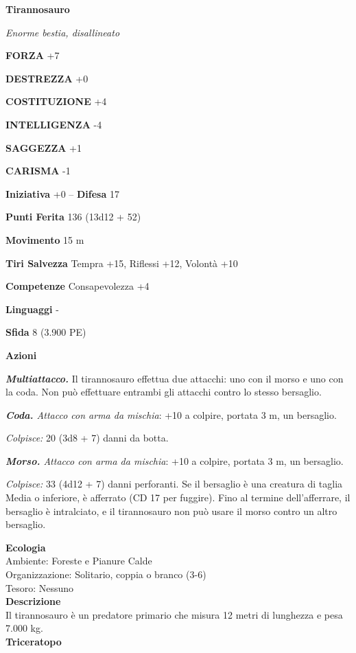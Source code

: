 \begin{multicols}{2}
\medskip{}\textbf{Tirannosauro}

\emph{Enorme bestia, disallineato}

\textbf{FORZA} +7

\textbf{DESTREZZA} +0

\textbf{COSTITUZIONE} +4

\textbf{INTELLIGENZA} -4

\textbf{SAGGEZZA} +1

\textbf{CARISMA} -1

\textbf{Iniziativa} +0 -- \textbf{Difesa} 17

\textbf{Punti Ferita} 136 (13d12 + 52)

\textbf{Movimento} 15 m

\textbf{Tiri Salvezza} Tempra +15, Riflessi +12, Volontà +10

\textbf{Competenze} Consapevolezza +4

\textbf{Linguaggi} -

\textbf{Sfida} 8 (3.900 PE)

\textbf{Azioni}

\emph{\textbf{Multiattacco.}} Il tirannosauro effettua due attacchi: uno con il morso e uno con la coda. Non può effettuare entrambi gli attacchi contro lo stesso bersaglio.

\emph{\textbf{Coda.} Attacco con arma da mischia}: +10 a colpire, portata 3 m, un bersaglio.

\emph{Colpisce:} 20 (3d8 + 7) danni da botta.

\emph{\textbf{Morso.} Attacco con arma da mischia}: +10 a colpire, portata 3 m, un bersaglio.

\emph{Colpisce:} 33 (4d12 + 7) danni perforanti. Se il bersaglio è una creatura di taglia Media o inferiore, è afferrato (CD 17 per fuggire). Fino al termine dell'afferrare, il bersaglio è intralciato, e il tirannosauro non può usare il morso contro un altro bersaglio.

\textbf{Ecologia}\\
Ambiente: Foreste e Pianure Calde\\
Organizzazione: Solitario, coppia o branco (3-6)\\
Tesoro: Nessuno\\
\textbf{Descrizione}\\
Il tirannosauro è un predatore primario che misura 12 metri di lunghezza e pesa 7.000 kg.\\


\medskip{}\textbf{Triceratopo}


\end{multicols}
